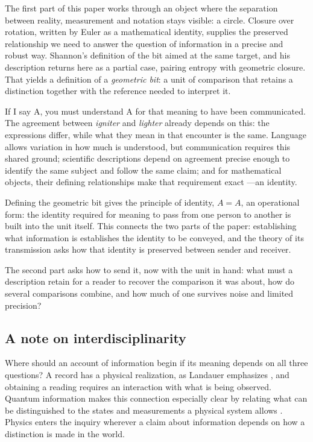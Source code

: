 \documentclass[11pt,a4paper]{article}
\theoremstyle{definition}
\begin{document}
The first part of this paper works through an object where the
separation between reality, measurement and notation stays visible: a
circle. Closure over rotation, written by Euler as a mathematical
identity, supplies the preserved relationship we need to answer the
question of information in a precise and robust way. Shannon's
definition of the bit aimed at the same target, and his description
returns here as a partial case, pairing entropy with geometric closure.
That yields a definition of a \emph{geometric bit}: a unit of comparison
that retains a distinction together with the reference needed to
interpret it.

If I say A, you must understand A for that meaning to have been communicated.
The agreement between \emph{igniter} and \emph{lighter} already depends
on this: the expressions differ, while what they mean in that encounter
is the same. Language allows variation in how much is understood, but
communication requires this shared ground; scientific descriptions depend
on agreement precise enough to identify the same subject and follow the
same claim; and for mathematical objects, their defining relationships make
that requirement exact ---an identity.

Defining the geometric bit gives the principle of identity, $A=A$, an
operational form: the identity required for meaning to pass from one
person to another is built into the unit itself. This connects the two
parts of the paper: establishing what information is establishes the
identity to be conveyed, and the theory of its transmission asks how
that identity is preserved between sender and receiver.

The second part asks how to send it, now with the unit in hand: what must a description
retain for a reader to recover the comparison it was about, how do
several comparisons combine, and how much of one survives noise and
limited precision?

\subsection*{A note on interdisciplinarity}

Where should an account of information begin if its meaning depends on
all three questions? A record has a physical realization, as Landauer
emphasizes \citep{Landauer1996}, and obtaining a reading requires an
interaction with what is being observed. Quantum information makes this
connection especially clear by relating what can be distinguished to
the states and measurements a physical system allows
\citep{NielsenChuang2010}. Physics enters the inquiry wherever a claim
about information depends on how a distinction is made in the world.
\end{document}
